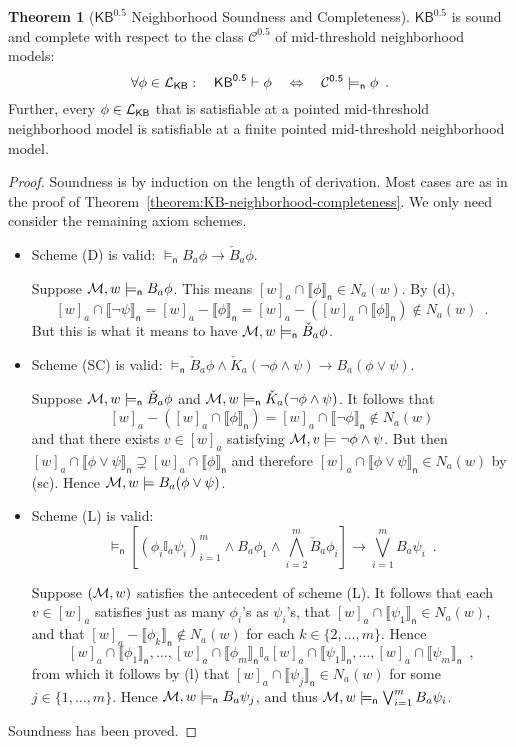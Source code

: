 \documentclass[12pt]{article}
\theoremstyle{definition}
\newtheorem{theorem}{Theorem}[section]
\newcommand{\M}{{\cal M}}      %
\newcommand{\Lang}{{\cal L}}   %
\newcommand{\KB}{{\mathsf{KB}}}                        %
\newcommand{\KBeq}{{\mathsf{KB}^{\mathsf{0.5}}}}       %
\newcommand{\Ceq}{{\mathcal{C}^{\mathsf{0.5}}}}    %
\newcommand{\modelsn}{\models_{\mathsf{n}}}                  %
\newcommand{\semn}[1]{\llbracket{#1}\rrbracket_{\mathsf{n}}} %
\begin{document}
\begin{theorem}[$\KBeq$ Neighborhood Soundness and Completeness]
  $\KBeq$ is sound and complete with respect to the class $\Ceq$ of
  mid-threshold neighborhood models:
  \[
  \forall\phi\in\Lang_\KB:\quad
  \KBeq\vdash\phi \quad\Leftrightarrow\quad \Ceq\modelsn\phi \enspace.
  \]
  Further, every $\phi\in\Lang_\KB$ that is satisfiable at a pointed
  mid-threshold neighborhood model is satisfiable at a finite
  pointed mid-threshold neighborhood model.
\end{theorem}
\begin{proof}
  Soundness is by induction on the length of derivation.  Most cases
  are as in the proof of
  Theorem~\ref{theorem:KB-neighborhood-completeness}.  We only need
  consider the remaining axiom schemes.
  \begin{itemize}
  \item Scheme (D) is valid: $\modelsn B_a\phi\to \check B_a\phi$.

    Suppose $\M,w\modelsn B_a\phi$. This means
    $[w]_a\cap\semn\phi\in N_a(w)$.  By (d), 
    \[
    [w]_a\cap\semn{\lnot\psi}=[w]_a-\semn\phi=[w]_a-([w]_a\cap\semn\phi)\notin
    N_a(w)\enspace.
    \]
    But this is what it means to have $\M,w\modelsn\check B_a\phi$.

  \item Scheme (SC) is valid: $\modelsn \check B_a\phi \land \check
    K_a(\lnot\phi\land\psi) \to B_a(\phi\lor\psi)$.

    Suppose $\M,w\modelsn\check B_a\phi$ and $\M,w\modelsn \check
    K_a(\lnot\phi\land\psi)$.  It follows that
    \[
    [w]_a-([w]_a\cap\semn{\phi})=[w]_a\cap\semn{\lnot\phi}\notin
    N_a(w)
    \]
    and that there exists $v\in[w]_a$ satisfying
    $\M,v\models\lnot\phi\land\psi$.  But then
    $[w]_a\cap\semn{\phi\lor\psi}\supsetneq[w]_a\cap\semn{\phi}$ and
    therefore $[w]_a\cap\semn{\phi\lor\psi}\in N_a(w)$ by (sc). Hence
    $\M,w\models B_a(\phi\lor\psi)$.

  \item Scheme (L) is valid:
    \[
    \modelsn \textstyle [(\phi_i\mathbb{I}_a\psi_i)_{i=1}^m
    \land B_a\phi_1 \land \bigwedge_{i=2}^m \check B_a\phi_i] \to
    \bigvee_{i=1}^m B_a\psi_i\enspace.
    \]

    Suppose $(\M,w)$ satisfies the antecedent of scheme (L).  It
    follows that each $v\in[w]_a$ satisfies just as many $\phi_i$'s as
    $\psi_i$'s, that $[w]_a\cap\semn{\psi_1}\in N_a(w)$, and that
    $[w]_a-\semn{\phi_k}\notin N_a(w)$ for each $k\in\{2,\dots,m\}$.
    Hence
    \[
    [w]_a\cap\semn{\phi_1},\dots,[w]_a\cap\semn{\phi_m}\mathbb{I}_a
    [w]_a\cap\semn{\psi_1},\dots, [w]_a\cap\semn{\psi_m}\enspace,
    \]
    from which it follows by (l) that $[w]_a\cap\semn{\psi_j}\in
    N_a(w)$ for some $j\in\{1,\dots,m\}$.  Hence $\M,w\modelsn B_a\psi_j$,
    and thus $\M,w\modelsn\bigvee_{i=1}^m B_a\psi_i$.
  \end{itemize}
  Soundness has been proved.  


\end{proof}
\end{document}
